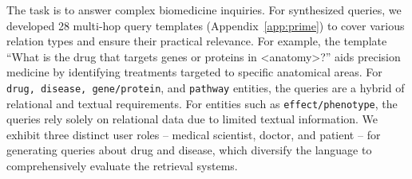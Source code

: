 \xhdr{\primekgt} 
The task is to answer complex biomedicine inquiries. 
For synthesized queries, we developed 28 multi-hop query templates (Appendix~\ref{app:prime}) to cover various relation types and ensure their practical relevance. 
For example, the template ``What is the drug that targets genes or proteins in <anatomy>?'' aids precision medicine by identifying treatments targeted to specific anatomical areas.
For \texttt{drug, disease, gene/protein}, and \texttt{pathway} entities, the queries are a hybrid of relational and textual requirements. 
For entities such as \texttt{effect/phenotype}, the queries rely solely on relational data due to limited textual information. 
We exhibit three distinct user roles – medical scientist, doctor, and patient – for generating queries about drug and disease, which diversify the language to comprehensively evaluate the retrieval systems.


